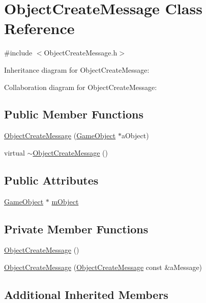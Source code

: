 \hypertarget{classObjectCreateMessage}{}\section{Object\+Create\+Message Class Reference}
\label{classObjectCreateMessage}


{\ttfamily \#include $<$Object\+Create\+Message.\+h$>$}



Inheritance diagram for Object\+Create\+Message\+:


Collaboration diagram for Object\+Create\+Message\+:
\subsection*{Public Member Functions}
\begin{DoxyCompactItemize}
\item 
\hyperlink{classObjectCreateMessage_a33e7c4de70994210c43907cfd099e979}{Object\+Create\+Message} (\hyperlink{classGameObject}{Game\+Object} $\ast$a\+Object)
\item 
virtual \hyperlink{classObjectCreateMessage_aba7f10de1ef786122e85b0f7dd26a8dd}{$\sim$\+Object\+Create\+Message} ()
\end{DoxyCompactItemize}
\subsection*{Public Attributes}
\begin{DoxyCompactItemize}
\item 
\hyperlink{classGameObject}{Game\+Object} $\ast$ \hyperlink{classObjectCreateMessage_a59ae35bb414b0b962d6982399c702f0f}{m\+Object}
\end{DoxyCompactItemize}
\subsection*{Private Member Functions}
\begin{DoxyCompactItemize}
\item 
\hyperlink{classObjectCreateMessage_a581487f2f765a4e3d24229bdd2b0a71d}{Object\+Create\+Message} ()
\item 
\hyperlink{classObjectCreateMessage_afd087183208a8f0d5627aaeed1cc6b24}{Object\+Create\+Message} (\hyperlink{classObjectCreateMessage}{Object\+Create\+Message} const \&a\+Message)
\end{DoxyCompactItemize}
\subsection*{Additional Inherited Members}


